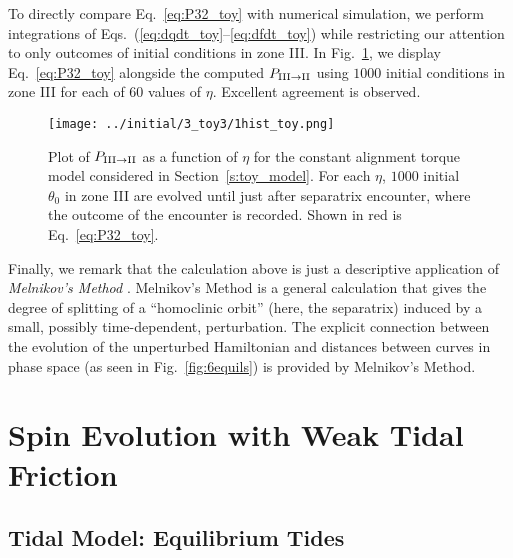 \documentclass[
        fleqn,
        usenatbib,
    ]{mnras}
\begin{document}
To directly compare Eq.~\eqref{eq:P32_toy} with numerical simulation, we
perform integrations of Eqs.~(\ref{eq:dqdt_toy}--\ref{eq:dfdt_toy}) while
restricting our attention to only outcomes of initial conditions in zone III\@.
In Fig.~\ref{fig:1hist_toy}, we display Eq.~\eqref{eq:P32_toy} alongside the
computed $P_{\rm III \to II}$ using $1000$ initial conditions in zone III for
each of $60$ values of $\eta$. Excellent agreement is observed.
\begin{figure}
    \centering
    \texttt{[image: ../initial/3\_toy3/1hist\_toy.png]}
    \caption{Plot of $P_{\rm III \to II}$ as a function of $\eta$ for the
    constant alignment torque model considered in Section~\ref{s:toy_model}. For
    each $\eta$, $1000$ initial $\theta_0$ in zone III are evolved until just
    after separatrix encounter, where the outcome of the encounter is recorded.
    Shown in red is Eq.~\eqref{eq:P32_toy}.}\label{fig:1hist_toy}
\end{figure}

Finally, we remark that the calculation above is just a descriptive application
of \emph{Melnikov's Method} \citep{g_and_h}. Melnikov's Method is a general
calculation that gives the degree of splitting of a ``homoclinic orbit'' (here,
the separatrix) induced by a small, possibly time-dependent, perturbation. The
explicit connection between the evolution of the unperturbed Hamiltonian and
distances between curves in phase space (as seen in Fig.~\ref{fig:6equils})
is provided by Melnikov's Method.

\section{Spin Evolution with Weak Tidal Friction}\label{s:full_tide_prob}

\subsection{Tidal Model: Equilibrium Tides}\label{ss:weaktide}
\end{document}
